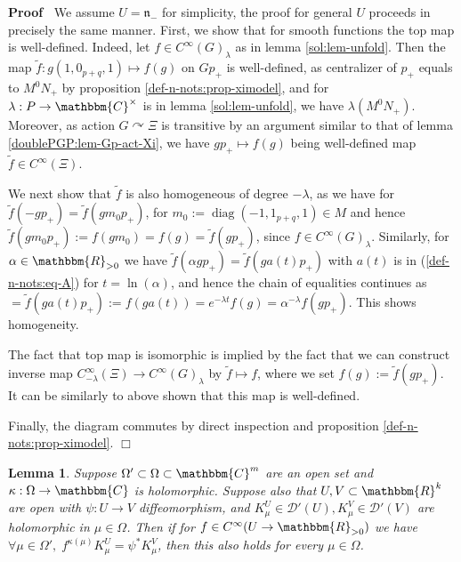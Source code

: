\documentclass{article}
\newcommand{\assign}{:=}
\newcommand{\tmop}[1]{\ensuremath{\operatorname{#1}}}
\renewenvironment{proof}{\noindent\textbf{Proof\ }}{\hspace*{\fill}$\Box$\medskip}
\newtheorem{lemma}[proposition]{Lemma}
\theoremstyle{remark}
\begin{document}
\begin{proof}
  We assume $U =\mathfrak{n}_-$ for simplicity, the proof for general $U$
  proceeds in precisely the same manner. First, we show that for smooth
  functions the top map is well-defined. Indeed, let $f \in C^{\infty}
  (G)_{\lambda} $ as in lemma \ref{sol:lem-unfold}. Then the map $\tilde{f} :
  g (1, 0_{p + q}, 1) \mapsto f (g)$ on $G p_+$ is well-defined, as
  centralizer of $p_+$ equals to $M^0 N_+$ by proposition
  \ref{def-n-nots:prop-ximodel}, and for $\lambda : P \rightarrow
  \mathbbm{C}^{\times}$ is in lemma \ref{sol:lem-unfold}, we have $\lambda
  (M^0 N_+)$. Moreover, as action $G \curvearrowright \Xi$ is transitive by an
  argument similar to that of lemma \ref{doublePGP:lem-Gp-act-Xi}, we have $g
  p_+ \mapsto f (g)$ being well-defined map $\tilde{f} \in C^{\infty} (\Xi)$.
  
  We next show that $\tilde{f}$ is also homogeneous of degree $- \lambda$, as
  we have for $\tilde{f} (- g p_+) = \tilde{f} (g m_0 p_+)$, for $m_0 \assign
  \tmop{diag} (- 1, 1_{p + q}, 1) \in M$ and hence $\tilde{f} (g m_0 p_+)
  \assign f (g m_0) = f (g) = \tilde{f} (g p_+)$, since $f \in C^{\infty}
  (G)_{\lambda}$. Similarly, for $\alpha \in \mathbbm{R}_{> 0}$ we have
  $\tilde{f} (\alpha g p_+) = \tilde{f} (g a (t) p_+)$ with $a (t)$ is in
  (\ref{def-n-nots:eq-A}) for $t = \ln (\alpha)$, and hence the chain of
  equalities continues as $= \tilde{f} (g a (t) p_+) \assign f (g a (t)) =
  e^{- \lambda t} f (g) = \alpha^{- \lambda} f (g p_+)$. This shows
  homogeneity.
  
  The fact that top map is isomorphic is implied by the fact that we can
  construct inverse map $C^{\infty}_{- \lambda} (\Xi) \rightarrow C^{\infty}
  (G)_{\lambda}$ by $\tilde{f} \mapsto f$, where we set $f (g) \assign
  \tilde{f} (g p_+)$. It can be similarly to above shown that this map is
  well-defined.
  
  Finally, the diagram commutes by direct inspection and proposition
  \ref{def-n-nots:prop-ximodel}.
\end{proof}

\begin{lemma}
  \label{sol:lem-holodep}Suppose $\Omega' \subset \Omega \subset
  \mathbbm{C}^m$ are an open set and $\kappa : \Omega \rightarrow \mathbbm{C}$
  is holomorphic. Suppose also that $U, V \subset \mathbbm{R}^k$ are open with
  $\psi : U \rightarrow V$ diffeomorphism, and $K_{\mu}^U \in \mathcal{D}'
  (U), K^V_{\mu} \in \mathcal{D}' (V)$ are holomorphic in $\mu \in \Omega$.
  Then if for $f \in C^{\infty} (U \rightarrow \mathbbm{R}_{> 0})$ we have
  $\forall \mu \in \Omega', \; f^{\kappa (\mu)} K^U_{\mu} = \psi^{\ast}
  K^V_{\mu}$, then this also holds for every $\mu \in \Omega$.
\end{lemma}
\end{document}
